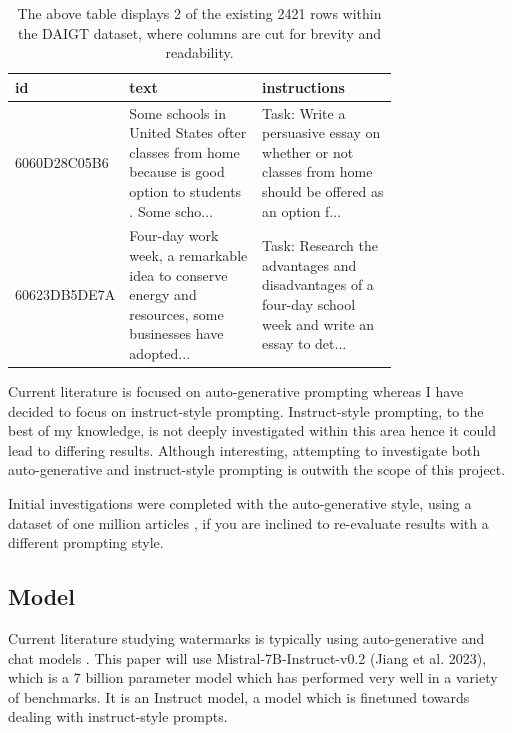 \documentclass{l4proj}
\theoremstyle{definition}
\begin{document}
        \begin{table}[ht]
            \centering
            \small 
            \begin{tabular}{@{}l|p{0.38\linewidth}|p{0.38\linewidth}@{}}
                \toprule
                id & text & instructions \\ \midrule
                6060D28C05B6 & Some schools in United States ofter classes from home because is good option to students . Some scho... & Task: Write a persuasive essay on whether or not classes from home should be offered as an option f... \\ \cmidrule(r){1-3}
                60623DB5DE7A & Four-day work week, a remarkable idea to conserve energy and resources, some businesses have adopted... & Task: Research the advantages and disadvantages of a four-day school week and write an essay to det... \\ \bottomrule
            \end{tabular}
            \captionsetup{width=.95\textwidth}
            \caption{The above table displays 2 of the existing 2421 rows within the DAIGT dataset, where columns are cut for brevity and readability.}
            \label{table:dataset-sample} 
        \end{table}

        Current literature is focused on auto-generative prompting whereas I have decided to focus on instruct-style prompting. Instruct-style prompting, to the best of my knowledge, is not deeply investigated within this area hence it could lead to differing results. Although interesting, attempting to investigate both auto-generative and instruct-style prompting is outwith the scope of this project.
        
        Initial investigations were completed with the auto-generative style, using a dataset of one million articles \citep{Signal1M2016}, if you are inclined to re-evaluate results with a different prompting style.
        
    \subsection{Model}
        Current literature studying watermarks is typically using auto-generative and chat models \citep{pang2024attacking, liu2024adaptive, kirchenbauer2023watermark, sadasivan2023aigenerated}. This paper will use Mistral-7B-Instruct-v0.2 (Jiang et al. 2023), which is a 7 billion parameter model which has performed very well in a variety of benchmarks. It is an Instruct model, a model which is finetuned towards dealing with instruct-style prompts.
\end{document}
